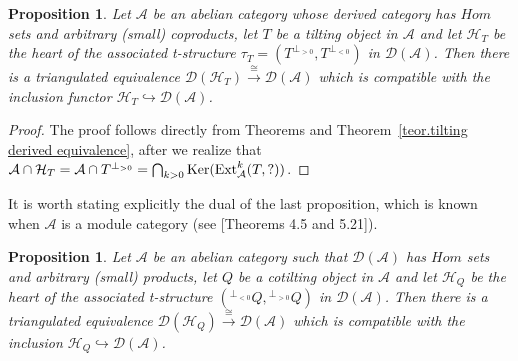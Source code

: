 \documentclass{proc-l}
\newcommand{\Ext}{{\rm Ext}}
\newtheorem{proposition}[theorem]{Proposition}
\theoremstyle{definition}
\theoremstyle{remark}
\numberwithin{equation}{section}
\begin{document}
\begin{proposition} \label{cor.tilting object Grothendieck category}
Let  $\mathcal{A}$ be an abelian category whose derived category has $Hom$ sets and arbitrary (small) coproducts, let $T$ be a tilting object in $\mathcal{A}$ 
and let $\mathcal{H}_T$ be the heart of the associated t-structure $\tau_T=(T^{\perp_{>0}},T^{\perp_{<0}})$ in $\mathcal{D}(\mathcal{A})$. Then there is a triangulated equivalence $\mathcal{D}(\mathcal{H}_T)\stackrel{\cong}{\longrightarrow}\mathcal{D}(\mathcal{A})$ which is compatible with the inclusion functor $\mathcal{H}_T\hookrightarrow\mathcal{D}(\mathcal{A})$. 
\end{proposition}
\begin{proof}
The proof follows directly from %
Theorems \cite{NSZM} and Theorem~\ref{teor.tilting derived equivalence}, after we realize that $\mathcal{A}\cap\mathcal{H}_T=\mathcal{A}\cap T^{\perp_{>0}}=\bigcap_{k>0}{\rm Ker}(\Ext^k_\mathcal{A}(T,?))$. 
\end{proof}

It is worth stating explicitly the dual of the last proposition, which is known when $\mathcal{A}$ is a module category (see \cite{Sto2}[Theorems 4.5 and 5.21]).

\begin{proposition} \label{cor.equivalence cotilting}
Let $\mathcal{A}$ be an abelian category such that $\mathcal{D}(\mathcal{A})$ has $Hom$ sets and arbitrary (small) products, let $Q$ be a cotilting object in $\mathcal{A}$ 
and let $\mathcal{H}_Q$ be the heart of the associated t-structure $({}^{\perp_{<0}}Q,{}^{\perp_{>0}}Q)$ in $\mathcal{D}(\mathcal{A})$. Then there is a triangulated equivalence $\mathcal{D}(\mathcal{H}_Q)\stackrel{\cong}{\longrightarrow}\mathcal{D}(\mathcal{A})$ which is compatible with the inclusion $\mathcal{H}_Q\hookrightarrow\mathcal{D}(\mathcal{A})$.
\end{proposition}
\end{document}
